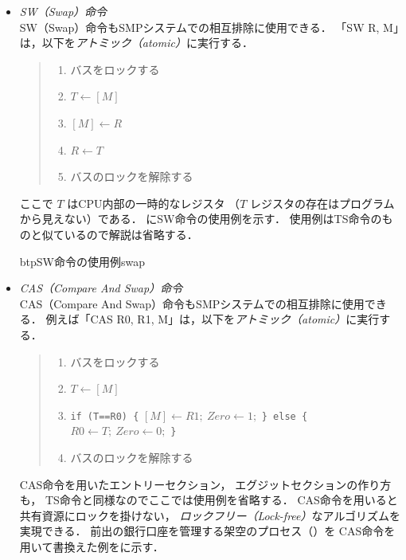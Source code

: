 \begin{itemize}
\item \emph{SW（Swap）命令} \\
  SW（Swap）命令もSMPシステムでの相互排除に使用できる．
  「SW  R, M」は，以下を\emph{アトミック（atomic）}に実行する．

  \begin{quote}
    \begin{enumerate}
    \item バスをロックする
    \item $T \leftarrow [M]$
    \item $[M] \leftarrow R$
    \item $R \leftarrow T$
    \item バスのロックを解除する
    \end{enumerate}
  \end{quote}

  ここで $T$ はCPU内部の一時的なレジスタ
  （$T$ レジスタの存在はプログラムから見えない）である．
  にSW命令の使用例を示す．
  使用例はTS命令のものと似ているので解説は省略する．

  \begin{myfig}{btp}{SW命令の使用例}{swap}
    
  \end{myfig}

\item \emph{CAS（Compare And Swap）命令}\\
  CAS（Compare And Swap）命令もSMPシステムでの相互排除に使用できる．
  例えば「CAS  R0, R1, M」は，以下を\emph{アトミック（atomic）}に実行する．

  \begin{quote}
    \begin{enumerate}
    \item バスをロックする
    \item $T \leftarrow [M]$
    \item \texttt{if (T==R0) \{} $[M] \leftarrow R1;~ Zero \leftarrow 1;$
      \texttt{\} else \{} $R0 \leftarrow T;~  Zero \leftarrow 0;$ \texttt{\}}
    \item バスのロックを解除する
    \end{enumerate}
  \end{quote}

  CAS命令を用いたエントリーセクション，
  エグジットセクションの作り方も，
  TS命令と同様なのでここでは使用例を省略する．
  CAS命令を用いると共有資源にロックを掛けない，
  \emph{ロックフリー（Lock-free）}なアルゴリズムを実現できる．
  前出の銀行口座を管理する架空のプロセス（）を
  CAS命令を用いて書換えた例をに示す．


\end{itemize}
